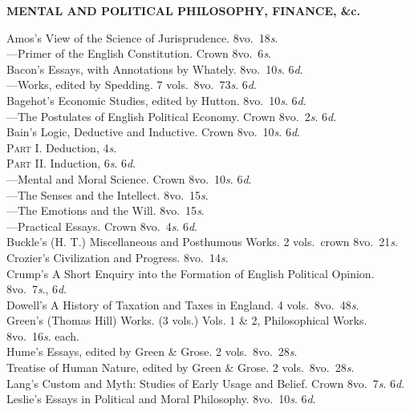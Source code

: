 \documentclass[letterpaper,12pt,oneside,openany]{memoir}
\newcommand{\D}{\hspace*{5mm}}
\newcommand{\E}{\hspace*{2mm}---\hspace*{2mm}}
\begin{document}
\begin{footnotesize}
\begin{center}
\textbf{MENTAL AND POLITICAL PHILOSOPHY, FINANCE, \&c.}
\end{center}
Amos's View of the Science of Jurisprudence. 8vo.\ 18\textit{s}.\\
\E Primer of the English Constitution. Crown 8vo.\ 6\textit{s}.\\
Bacon's Essays, with Annotations by Whately. 8vo.\ 10\textit{s}. 6\textit{d}.\\
\E Works, edited by Spedding. 7 vols.\ 8vo.\ 73\textit{s}. 6\textit{d}.\\
Bagehot's Economic Studies, edited by Hutton. 8vo.\ 10\textit{s}. 6\textit{d}.\\
\E The Postulates of English Political Economy. Crown 8vo.\ 2\textit{s}. 6\textit{d}.\\
Bain's Logic, Deductive and Inductive. Crown 8vo.\ 10\textit{s}. 6\textit{d}.\\
\D \textsc{Part I.} Deduction, 4\textit{s}.\\
\D \textsc{Part II.} Induction, 6\textit{s}. 6\textit{d}.\\
\E Mental and Moral Science. Crown 8vo.\ 10\textit{s}. 6\textit{d}.\\
\E The Senses and the Intellect. 8vo.\ 15\textit{s}.\\
\E The Emotions and the Will. 8vo.\ 15\textit{s}.\\
\E Practical Essays. Crown 8vo.\ 4\textit{s}. 6\textit{d}.\\
Buckle's (H. T.) Miscellaneous and Posthumous Works. 2 vols.\ crown 8vo.\ 21\textit{s}.\\
Crozier's Civilization and Progress. 8vo.\ 14\textit{s}.\\
Crump's A Short Enquiry into the Formation of English Political Opinion. 8vo.\ 7\textit{s}., 6\textit{d}.\\
Dowell's A History of Taxation and Taxes in England. 4 vols.\ 8vo.\ 48\textit{s}.\\
Green's (Thomas Hill) Works. (3 vols.) Vols. 1 \& 2, Philosophical Works. 8vo.\ 16\textit{s}. each.\\
Hume's Essays, edited by Green \& Grose. 2 vols.\ 8vo.\ 28\textit{s}.\\
\D Treatise of Human Nature, edited by Green \& Grose. 2 vols.\ 8vo.\ 28\textit{s}.\\
Lang's Custom and Myth: Studies of Early Usage and Belief. Crown 8vo.\ 7\textit{s}. 6\textit{d}.\\
Leslie's Essays in Political and Moral Philosophy. 8vo.\ 10\textit{s}. 6\textit{d}.\\

\end{footnotesize}
\end{document}

